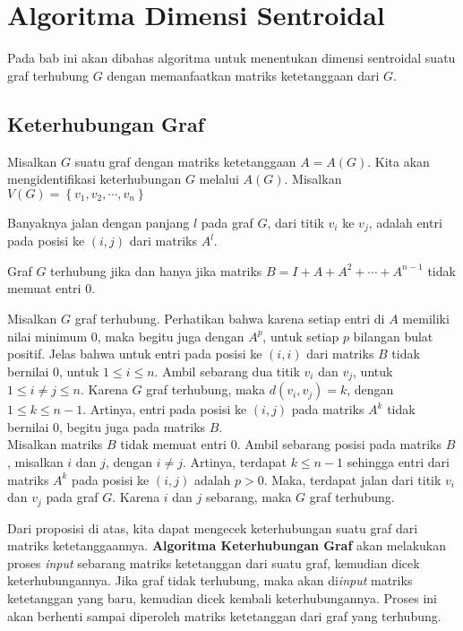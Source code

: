 \chapter{Algoritma Dimensi Sentroidal}
\pagestyle{fancy}
\fancyhead[R]{}
\fancyfoot[C]{\thepage}
\onehalfspacing

Pada bab ini akan dibahas algoritma untuk menentukan dimensi sentroidal suatu graf terhubung $G$ dengan memanfaatkan matriks ketetanggaan dari $G$.
\section{Keterhubungan Graf}
Misalkan $G$ suatu graf dengan matriks ketetanggaan $A=A(G)$. Kita akan mengidentifikasi keterhubungan $G$ melalui $A(G)$. Misalkan $V(G)=\left\{v_1,v_2,\cdots,v_n\right\}$
\begin{lemma}\cite{Bi01}
	Banyaknya jalan dengan panjang $l$ pada graf $G$, dari titik $v_i$ ke $v_j$, adalah entri pada posisi ke $(i,j)$ dari matriks $A^l$.
\end{lemma}

\begin{proposisi}
	Graf $G$ terhubung jika dan hanya jika matriks $B=I+A+A^2+\cdots+A^{n-1}$ tidak memuat entri $0$.
\end{proposisi}
\begin{pf}
	Misalkan $G$ graf terhubung. Perhatikan bahwa karena setiap entri di $A$ memiliki nilai minimum $0$, maka begitu juga dengan $A^p$, untuk setiap $p$ bilangan bulat positif. Jelas bahwa untuk entri pada posisi ke $(i,i)$ dari matriks $B$ tidak bernilai $0$, untuk $1\le i\le n$. Ambil sebarang dua titik $v_i$ dan $v_j$, untuk $1\le i\ne j\le n$. Karena $G$ graf terhubung, maka $d(v_i,v_j)=k$, dengan $1\le k\le n-1$. Artinya, entri pada posisi ke $(i,j)$ pada matriks $A^k$ tidak bernilai $0$, begitu juga pada matriks $B$.\\
	Misalkan matriks $B$ tidak memuat entri $0$. Ambil sebarang posisi pada matriks $B$, misalkan $i$ dan $j$, dengan $i\ne j$. Artinya, terdapat $k\le n-1$ sehingga  entri dari matriks $A^k$ pada posisi ke $(i,j)$ adalah $p>0$. Maka, terdapat jalan dari titik $v_i$ dan $v_j$ pada graf $G$. Karena $i$ dan $j$ sebarang, maka $G$ graf terhubung.
\end{pf}

Dari proposisi di atas, kita dapat mengecek keterhubungan suatu graf dari matriks ketetanggaannya. \textbf{Algoritma Keterhubungan Graf} akan melakukan proses \textit{input} sebarang matriks ketetanggan dari suatu graf, kemudian dicek keterhubungannya. Jika graf tidak terhubung, maka akan di\textit{input} matriks ketetanggan yang baru, kemudian dicek kembali keterhubungannya. Proses ini akan berhenti sampai diperoleh matriks ketetanggan dari graf yang terhubung.

